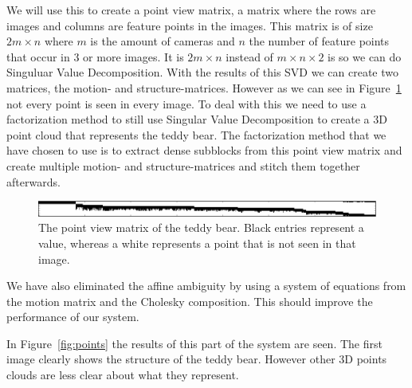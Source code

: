 We will use this to create a point view matrix, a matrix where the rows are images and columns are feature points in the images.
This matrix is of size $2m \times n$ where $m$ is the amount of cameras and $n$ the number of feature points that occur in 3 or more images. 
It is $2m \times n$ instead of $m \times n \times 2$ is so we can do Singuluar Value Decomposition.
With the results of this SVD we can create two matrices, the motion- and structure-matrices.
However as we can see in Figure~\ref{fig:pvm} not every point is seen in every image.
To deal with this we need to use a factorization method to still use Singular Value Decomposition to create a 3D point cloud that represents the teddy bear.
The factorization method that we have chosen to use is to extract dense subblocks from this point view matrix  and create multiple motion- and structure-matrices and stitch them together afterwards.

\begin{figure}[ht]
	\centering
	\includegraphics[width=\textwidth]{pvm}
	\caption{The point view matrix of the teddy bear. Black entries represent a value, whereas a white represents a point that is not seen in that image.}
	\label{fig:pvm}
\end{figure}

We have also eliminated the affine ambiguity by using a system of equations from the motion matrix and the Cholesky composition. This should improve the performance of our system.

In Figure~\ref{fig:points} the results of this part of the system are seen. The first image clearly shows the structure of the teddy bear. However other 3D points clouds are less clear about what they represent.

